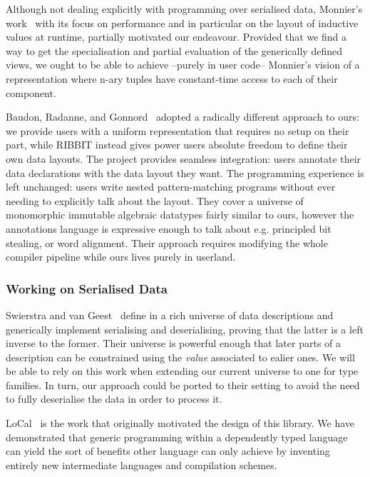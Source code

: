 Although not dealing explicitly with programming over serialised data,
Monnier's work~\cite{DBLP:conf/icfp/Monnier19} with its focus on performance and
in particular on the layout of inductive values at runtime,
partially motivated our endeavour.
%
Provided that we find a way to get the specialisation and partial evaluation
of the generically defined views, we ought to be able to achieve --purely in
user code-- Monnier's vision of a representation where n-ary tuples have
constant-time access to each of their component.

Baudon, Radanne, and Gonnord~\cite{ACM:conf/icfp/Baudon23} adopted
a radically different approach to ours: we provide users with a
uniform representation that requires no setup on their part,
while \textsc{RIBBIT} instead gives power users absolute freedom
to define their own data layouts.
%
The project provides seamless integration: users annotate their
data declarations with the data layout they want.
%
The programming experience is left unchanged: users write nested
pattern-matching programs without ever needing to explicitly talk
about the layout.
%
They cover a universe of monomorphic immutable algebraic datatypes
fairly similar to ours, however the annotations language is expressive
enough to talk about e.g. principled bit stealing, or word alignment.
%
Their approach requires modifying the whole compiler pipeline while
ours lives purely in userland.
%


\subsubsection{Working on Serialised Data}

Swierstra and van Geest~\cite{DBLP:conf/icfp/GeestS17}
define in \agda{} a rich universe of data descriptions
and generically implement serialising and deserialising,
proving that the latter is a left inverse to the former.
%
Their universe is powerful enough that later parts of a
description can be constrained using the \emph{value}
associated to ealier ones.
%
We will be able to rely on this work when extending our
current universe to one for type families.
%
In turn, our approach could be ported to their setting
to avoid the need to fully deserialise the data in order
to process it.


LoCal~\cite{DBLP:conf/pldi/VollmerKRS0N19} is the work that originally
motivated the design of this library.
%
We have demonstrated that generic programming within a dependently typed
language can yield the sort of benefits other language can only achieve
by inventing entirely new intermediate languages and compilation schemes.

